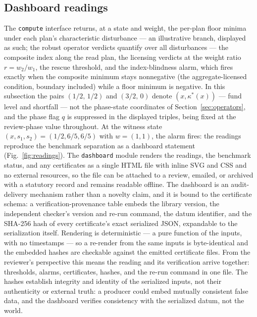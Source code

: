 \documentclass[3p,11pt]{elsarticle}
\begin{document}
\subsection{Dashboard readings}\label{sec:readings}

The \texttt{compute} interface returns, at a state and weight, the per-plan
floor minima under each plan's characteristic disturbance --- an
illustrative branch, displayed as such; the robust operator verdicts
quantify over all disturbances --- the composite
index along the read plan, the licensing verdicts at the weight ratio
$r = w_2/w_1$, the rescue threshold, and the index-blindness alarm, which
fires exactly when the composite minimum stays nonnegative (the
aggregate-licensed condition, boundary included) while a floor
minimum is negative. In this subsection the pairs $(1/2,\, 1/2)$ and
$(3/2,\, 0)$ denote $(x, \kappa^*(x))$ --- fund level and shortfall --- not
the phase-state coordinates of Section~\ref{sec:operators}, and the phase
flag $q$ is suppressed in the displayed triples, being fixed at the
review-phase value throughout. At the witness state $(x, s_1, s_2) = (1/2, 6/5, 6/5)$
with $w = (1,1)$, the alarm fires: the readings reproduce the benchmark
separation as a dashboard statement (Fig.~\ref{fig:readings}). The
\texttt{dashboard} module renders the readings, the benchmark status, and
any certificates as a single HTML file with inline SVG and CSS and no
external resources, so the file can be attached to a review, emailed, or
archived with a statutory record and remains readable offline. The
dashboard is an audit-delivery mechanism rather than a novelty claim, and
it is bound to the certificate schema: a verification-provenance table
embeds the library version, the independent checker's version and re-run
command, the datum identifier, and the SHA-256 hash of every
certificate's exact serialized JSON, expandable to the serialization
itself. Rendering is deterministic --- a pure function of the inputs,
with no timestamps --- so a re-render from the same inputs is
byte-identical and the embedded hashes are checkable against the emitted
certificate files. From the reviewer's perspective this means the reading
and its verification arrive together: thresholds, alarms, certificates,
hashes, and the re-run command in one file. The hashes establish
integrity and identity of the serialized inputs, not their authenticity
or external truth: a producer could embed mutually consistent false
data, and the dashboard verifies consistency with the serialized datum,
not the world.
\end{document}
